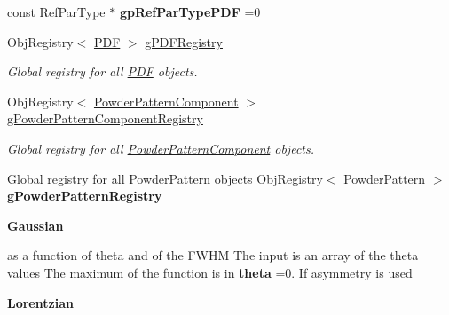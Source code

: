 \begin{DoxyCompactItemize}
const Ref\+Par\+Type $\ast$ {\bfseries gp\+Ref\+Par\+Type\+P\+DF} =0
\item 
\mbox{\label{namespace_obj_cryst_a935e2d4172697e1a66a047fcaa7c05bb}} 
Obj\+Registry$<$ \mbox{\hyperlink{class_obj_cryst_1_1_p_d_f}{P\+DF}} $>$ \mbox{\hyperlink{namespace_obj_cryst_a935e2d4172697e1a66a047fcaa7c05bb}{g\+P\+D\+F\+Registry}}
\begin{DoxyCompactList}\small\item\em Global registry for all \mbox{\hyperlink{class_obj_cryst_1_1_p_d_f}{P\+DF}} objects. \end{DoxyCompactList}\item 
\mbox{\label{namespace_obj_cryst_a25a605005bfdd2528b04543f7c4f5908}} 
Obj\+Registry$<$ \mbox{\hyperlink{class_obj_cryst_1_1_powder_pattern_component}{Powder\+Pattern\+Component}} $>$ \mbox{\hyperlink{namespace_obj_cryst_a25a605005bfdd2528b04543f7c4f5908}{g\+Powder\+Pattern\+Component\+Registry}}
\begin{DoxyCompactList}\small\item\em Global registry for all \mbox{\hyperlink{class_obj_cryst_1_1_powder_pattern_component}{Powder\+Pattern\+Component}} objects. \end{DoxyCompactList}\item 
\mbox{\label{namespace_obj_cryst_a2c5a5c8d569a8be6f249055c1c81506f}} 
Global registry for all \mbox{\hyperlink{class_obj_cryst_1_1_powder_pattern}{Powder\+Pattern}} objects Obj\+Registry$<$ \mbox{\hyperlink{class_obj_cryst_1_1_powder_pattern}{Powder\+Pattern}} $>$ {\bfseries g\+Powder\+Pattern\+Registry}
\item 
\mbox{\label{namespace_obj_cryst_ac8bf8797f13f0d20884003e6aee48510}} 
{\bfseries Gaussian}
\item 
\mbox{\label{namespace_obj_cryst_a9df81c9b88f96d1f0b3b5fedd6772925}} 
as a function of theta and of the F\+W\+HM The input is an array of the theta values The maximum of the function is in {\bfseries theta} =0. If asymmetry is used
\item 
\mbox{\label{namespace_obj_cryst_a6fe14f0ac8519099e0d103bf390dc669}} 
{\bfseries Lorentzian}
\item 

\end{DoxyCompactItemize}

